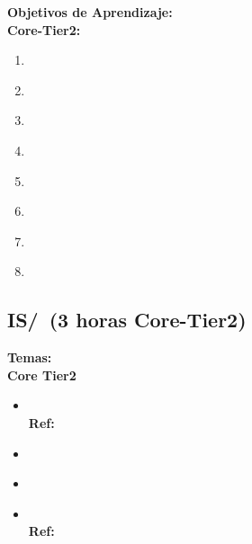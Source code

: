 \noindent \textbf{Objetivos de Aprendizaje:}\\
\noindent \textbf{Core-Tier2:}
\begin{enumerate}
	\setcounter{enumi}{0}
	\item \ISBasicSearchStrategiesLOFormulate\xspace[\ISBasicSearchStrategiesLOFormulateLevel]\label{sec:BOK:ISBasicSearchStrategiesLOFormulate}
	\item \ISBasicSearchStrategiesLODescribeTheHeuristics\xspace[\ISBasicSearchStrategiesLODescribeTheHeuristicsLevel]\label{sec:BOK:ISBasicSearchStrategiesLODescribeTheHeuristics}
	\item \ISBasicSearchStrategiesLODescribeTheCombinatorial\xspace[\ISBasicSearchStrategiesLODescribeTheCombinatorialLevel]\label{sec:BOK:ISBasicSearchStrategiesLODescribeTheCombinatorial}
	\item \ISBasicSearchStrategiesLOSelectAndAppropriate\xspace[\ISBasicSearchStrategiesLOSelectAndAppropriateLevel]\label{sec:BOK:ISBasicSearchStrategiesLOSelectAndAppropriate}
	\item \ISBasicSearchStrategiesLOSelectAndAppropriateAlgorithm\xspace[\ISBasicSearchStrategiesLOSelectAndAppropriateAlgorithmLevel]\label{sec:BOK:ISBasicSearchStrategiesLOSelectAndAppropriateAlgorithm}
	\item \ISBasicSearchStrategiesLOEvaluateWhether\xspace[\ISBasicSearchStrategiesLOEvaluateWhetherLevel]\label{sec:BOK:ISBasicSearchStrategiesLOEvaluateWhether}
	\item \ISBasicSearchStrategiesLOFormulateA\xspace[\ISBasicSearchStrategiesLOFormulateALevel]\label{sec:BOK:ISBasicSearchStrategiesLOFormulateA}
	\item \ISBasicSearchStrategiesLOCompareAndSearch\xspace[\ISBasicSearchStrategiesLOCompareAndSearchLevel]\label{sec:BOK:ISBasicSearchStrategiesLOCompareAndSearch}
\end{enumerate}


\subsection{IS/\ISBasicKnowledgeRepresentationandReasoning~(3 horas Core-Tier2)}\label{sec:BOK:ISBasicKnowledgeRepresentationandReasoning}
\noindent \textbf{Temas:}\\
\noindent \textbf{Core Tier2}
\begin{itemize}
	\item \ISBasicKnowledgeRepresentationandReasoningTopicReview\xspace \\ \textbf{Ref:} \label{sec:BOK:ISBasicKnowledgeRepresentationandReasoningTopicReview}
	\item \ISBasicKnowledgeRepresentationandReasoningTopicResolution\label{sec:BOK:ISBasicKnowledgeRepresentationandReasoningTopicResolution}
	\item \ISBasicKnowledgeRepresentationandReasoningTopicForward\label{sec:BOK:ISBasicKnowledgeRepresentationandReasoningTopicForward}
	\item \ISBasicKnowledgeRepresentationandReasoningTopicReviewOf\xspace \\ \textbf{Ref:} \label{sec:BOK:ISBasicKnowledgeRepresentationandReasoningTopicReviewOf}
\end{itemize}


